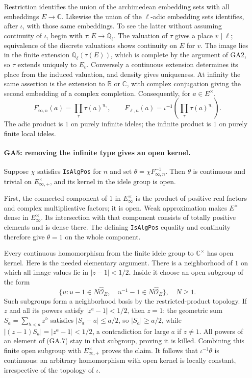 Restriction identifies the union of the archimedean embedding sets
with all embeddings $E\to\mathbb C$. Likewise the union of the
$\ell$-adic embedding sets identifies, after $\iota$, with those
same embeddings. To see the latter without assuming continuity of
$\iota$, begin with $\tau:E\to\overline{\mathbb Q}_\ell$.
The valuation of $\tau$ gives a place $v\mid\ell$; equivalence of
the discrete valuations shows continuity on $E$ for $v$.
The image lies in the finite extension
$\mathbb Q_\ell(\tau(E))$, which is complete by the argument of
GA2, so $\tau$ extends uniquely to $E_v$. Conversely a continuous
extension determines its place from the induced valuation, and
density gives uniqueness. At infinity the same assertion is
the extension to $\mathbb R$ or $\mathbb C$, with complex
conjugation giving the second embedding of a complex completion.
Consequently, for $a\in E^\times$,
\[
 F_{\infty,n}(a)=\prod_\tau\tau(a)^{n_\tau},\qquad
 F_{\ell,n}(a)=\iota^{-1}\!\left(\prod_\tau\tau(a)^{n_\tau}\right).
                                                                  \tag{GA.6}
\]
The adic product is $1$ on purely infinite ideles; the infinite
product is $1$ on purely finite local ideles.

\paragraph{GA5: removing the infinite type gives an open kernel.}
Suppose $\chi$ satisfies \texttt{IsAlgPos} for $n$ and set
$\theta=\chi F_{\infty,n}^{-1}$. Then $\theta$ is continuous and
trivial on $E_{\infty,+}^\times$, and its kernel in the idele group
is open.

First, the connected component of $1$ in
$E_\infty^\times$ is the product of positive real factors and
complex multiplicative factors; it is open. Weak approximation
makes $E^\times$ dense in $E_\infty^\times$. Its intersection with
that component consists of totally positive elements and is dense
there. The defining \texttt{IsAlgPos} equality and continuity
therefore give $\theta=1$ on the whole component.

Every continuous homomorphism from the finite idele group to
$\mathbb C^\times$ has open kernel. Here is the needed elementary
argument. There is a neighborhood of $1$ on which all image values
lie in $|z-1|<1/2$. Inside it choose an open subgroup of the form
\[
 \{u:u-1\in N\widehat{\mathcal O}_E,\quad
           u^{-1}-1\in N\widehat{\mathcal O}_E\},\quad N\geq1.
                                                                  \tag{GA.7}
\]
Such subgroups form a neighborhood basis by the restricted-product
topology. If $z$ and all its powers satisfy $|z^a-1|<1/2$,
then $z=1$: the geometric sum $S_a=\sum_{h<a}z^h$ satisfies
$|S_a-a|\leq a/2$, so $|S_a|\geq a/2$, while
$|(z-1)S_a|=|z^a-1|<1/2$, a contradiction for large $a$ if
$z\ne1$. All powers of an element of (GA.7) stay in that
subgroup, proving it is killed. Combining this finite open
subgroup with $E_{\infty,+}^\times$ proves the claim.
It follows that $\iota^{-1}\theta$ is continuous: an arbitrary
homomorphism with open kernel is locally constant, irrespective
of the topology of $\iota$.


